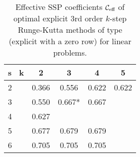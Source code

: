 \documentclass[12pt]{article}
\begin{document}
\begin{table}
\center
\begin{tabular}{l|cccc} \hline
s \ k & 2     & 3     & 4     & 5 \\ \hline
2 & 0.366 & 0.556 & 0.622 & 0.622 \\
3 & 0.550 & 0.667*& 0.667 & \\
4 & 0.627 &       &       & \\
5 & 0.677 & 0.679 & 0.679 & \\ 
6 & 0.705 & 0.705 & 0.705      & \\ \hline
\end{tabular}
\caption{Effective SSP coefficients $\mathcal{C}_{\textup{eff}}$ of optimal
  explicit 3rd order $k$-step Runge-Kutta methods of type (explicit with
  a zero row) for linear problems.}
\label{tbl-3order}
\end{table}




\end{document}
